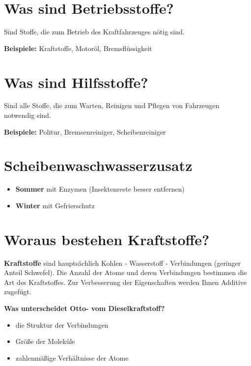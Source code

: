 \section{Was sind Betriebsstoffe?}\label{was-sind-betriebsstoffe}

Sind Stoffe, die zum Betrieb des Kraftfahrzeuges nötig sind.

\textbf{Beispiele:} Kraftstoffe, Motoröl, Bremsflüssigkeit

\section{Was sind Hilfsstoffe?}\label{was-sind-hilfsstoffe}

Sind alle Stoffe, die zum Warten, Reinigen und Pflegen von Fahrzeugen
notwendig sind.

\textbf{Beispiele:} Politur, Bremsenreiniger, Scheibenreiniger

\section{Scheibenwaschwasserzusatz}\label{scheibenwaschwasserzusatz}

\begin{itemize}
\item
  \textbf{Sommer} mit Enzymen (Insektenreste besser entfernen)
\item
  \textbf{Winter} mit Gefrierschutz
\end{itemize}

\section{Woraus bestehen
Kraftstoffe?}\label{woraus-bestehen-kraftstoffe}

\textbf{Kraftstoffe} sind hauptsächlich Kohlen - Wasserstoff -
Verbindungen (geringer Anteil Schwefel). Die Anzahl der Atome und deren
Verbindungen bestimmen die Art des Kraftstoffes. Zur Verbesserung der
Eigenschaften werden Ihnen Additive zugefügt.

\textbf{Was unterscheidet Otto- vom Dieselkraftstoff?}

\begin{itemize}
\item
  die Struktur der Verbindungen
\item
  Größe der Moleküle
\item
  zahlenmäßige Verhältnisse der Atome
\end{itemize}

